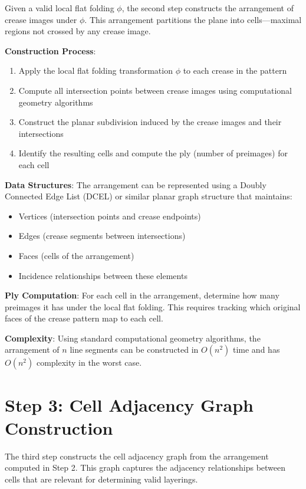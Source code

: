 Given a valid local flat folding $\phi$, the second step constructs the arrangement of crease images under $\phi$. This arrangement partitions the plane into cells—maximal regions not crossed by any crease image.

\textbf{Construction Process}:
\begin{enumerate}
\item Apply the local flat folding transformation $\phi$ to each crease in the pattern
\item Compute all intersection points between crease images using computational geometry algorithms
\item Construct the planar subdivision induced by the crease images and their intersections
\item Identify the resulting cells and compute the ply (number of preimages) for each cell
\end{enumerate}

\textbf{Data Structures}: The arrangement can be represented using a Doubly Connected Edge List (DCEL) or similar planar graph structure that maintains:
\begin{itemize}
\item Vertices (intersection points and crease endpoints)
\item Edges (crease segments between intersections)
\item Faces (cells of the arrangement)
\item Incidence relationships between these elements
\end{itemize}

\textbf{Ply Computation}: For each cell in the arrangement, determine how many preimages it has under the local flat folding. This requires tracking which original faces of the crease pattern map to each cell.

\textbf{Complexity}: Using standard computational geometry algorithms, the arrangement of $n$ line segments can be constructed in $O(n^2)$ time and has $O(n^2)$ complexity in the worst case.

\section{Step 3: Cell Adjacency Graph Construction}

The third step constructs the cell adjacency graph from the arrangement computed in Step 2. This graph captures the adjacency relationships between cells that are relevant for determining valid layerings.


